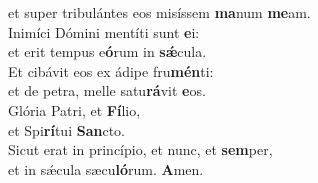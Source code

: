 \oddverse et super tribulántes eos misíssem \textbf{ma}num \textbf{me}am.\\
\evenverse Inimíci Dómini mentíti sunt \textbf{e}i:~\*\\
\evenverse et erit tempus e\textbf{ó}rum in \textbf{sǽ}cula.\\
\oddverse Et cibávit eos ex ádipe fru\textbf{mén}ti:~\*\\
\oddverse et de petra, melle satu\textbf{rá}vit \textbf{e}os.\\
\evenverse Glória Patri, et \textbf{Fí}lio,~\*\\
\evenverse et Spi\textbf{rí}tui \textbf{San}cto.\\
\oddverse Sicut erat in princípio, et nunc, et \textbf{sem}per,~\*\\
\oddverse et in sǽcula sæcu\textbf{ló}rum. \textbf{A}men.\\
